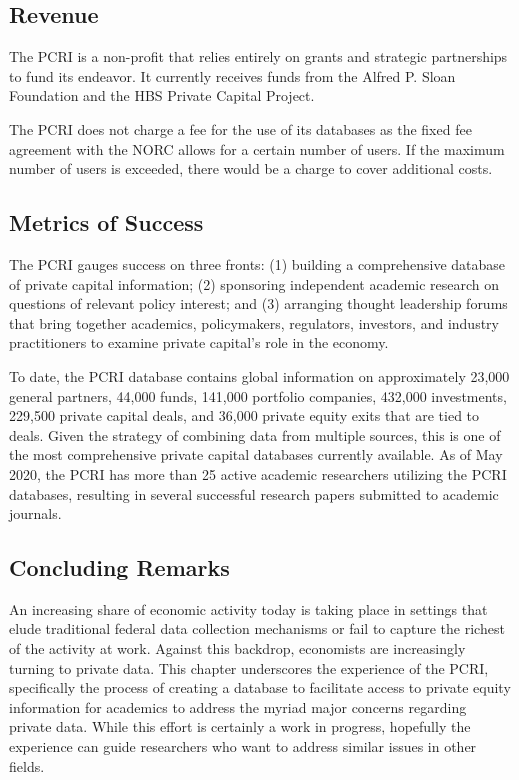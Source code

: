 \hypertarget{revenue-1}{%
\subsection{Revenue}\label{revenue-1}}

The PCRI is a non-profit that relies entirely on grants and strategic partnerships to fund its endeavor. It currently receives funds from the Alfred P. Sloan Foundation and the HBS Private Capital Project.

The PCRI does not charge a fee for the use of its databases as the fixed fee agreement with the NORC allows for a certain number of users. If the maximum number of users is exceeded, there would be a charge to cover additional costs.

\hypertarget{metrics-of-success-2}{%
\subsection{Metrics of Success}\label{metrics-of-success-2}}

The PCRI gauges success on three fronts: (1) building a comprehensive database of private capital information; (2) sponsoring independent academic research on questions of relevant policy interest; and (3) arranging thought leadership forums that bring together academics, policymakers, regulators, investors, and industry practitioners to examine private capital's role in the economy.

To date, the PCRI database contains global information on approximately 23,000 general partners, 44,000 funds, 141,000 portfolio companies, 432,000 investments, 229,500 private capital deals, and 36,000 private equity exits that are tied to deals. Given the strategy of combining data from multiple sources, this is one of the most comprehensive private capital databases currently available. As of May 2020, the PCRI has more than 25 active academic researchers utilizing the PCRI databases, resulting in several successful research papers submitted to academic journals.

\hypertarget{concluding-remarks}{%
\subsection{Concluding Remarks}\label{concluding-remarks}}

An increasing share of economic activity today is taking place in settings that elude traditional federal data collection mechanisms or fail to capture the richest of the activity at work. Against this backdrop, economists are increasingly turning to private data. This chapter underscores the experience of the PCRI, specifically the process of creating a database to facilitate access to private equity information for academics to address the myriad major concerns regarding private data. While this effort is certainly a work in progress, hopefully the experience can guide researchers who want to address similar issues in other fields.

